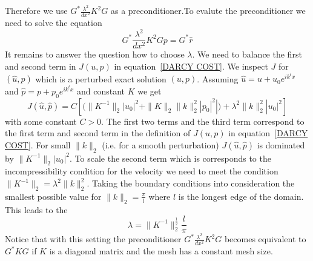 Therefore we use $G^* \frac{\lambda^2}{dx^2} K^2 G$ as a preconditioner.To evalute the preconditioner
we need to solve the equation
\begin{equation}\label{UPDATE P}
 G^* \frac{\lambda^2}{dx^2} K^2 G p =  G^* \hat{r}
\end{equation}
It remains to answer the question how to choose $\lambda$. We need to balance the first and second
term in $J(u,p)$ in equation~\ref{DARCY COST}. We inspect $J$ for 
$(\hat{u}, \hat{p})$ which is a perturbed exact solution $(u,p)$.   
Assuming $\hat{u}=u+u_{0}e^{ik^tx}$
and $\hat{p}=p+p_{0}e^{ik^tx}$ and constant $K$ we get 
\begin{equation}
J(\hat{u},\hat{p}) = C \left[ ( \|K^{-1}\|_{2} |u_{0}|^2 + \|K\|_{2} \|k\|_{2}^2 |p_{0}|^2| )
+ \lambda^2 \|k\|_{2}^2 |u_{0}|^2  \right]
\end{equation} 
with some constant $C>0$. The first two terms and the third term correspond to the first term and
second term in the definition of $J(u,p)$ in equation~\ref{DARCY COST}. For small $\|k\|_{2}$
(i.e. for a smooth perturbation) $J(\hat{u},\hat{p})$ is dominated by $\|K^{-1}\|_{2} |u_{0}|^2$.
To scale the second term which is corresponds to the incompressibility condition for the velocity
we need to meet the condition $\|K^{-1}\|_{2} =  \lambda^2 \|k\|_{2}^2$. 
Taking the boundary conditions into consideration the smallest possible value for $\|k\|_{2} = \frac{\pi}{l}$ where $l$ is the longest edge of the domain. This leads to the 
\begin{equation}\label{DARCY LAMBDA}
\lambda = \|K^{-1}\|_{2}^{\frac{1}{2}} \frac{l}{\pi}
\end{equation} 
Notice that with this setting the preconditioner $G^* \frac{\lambda^2}{dx^2} K^2 G$ becomes 
equivalent to $G^* K G$ if $K$ is a diagonal matrix and the mesh has a constant mesh size.

